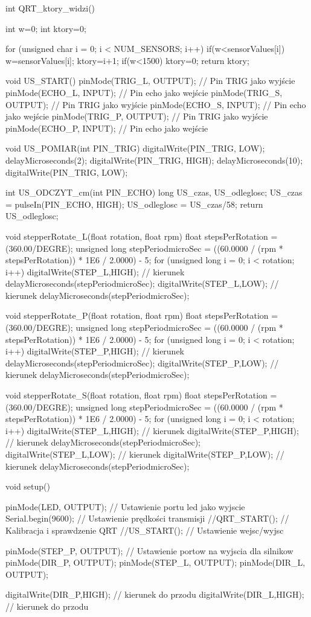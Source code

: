 int QRT_ktory_widzi(){
  int w=0;
  int ktory=0;
  
  for (unsigned char i = 0; i < NUM_SENSORS; i++)
  {
    if(w<sensorValues[i])
    {
      w=sensorValues[i];
      ktory=i+1;
    }
    if(w<1500)
    {
      ktory=0;
    }
  }
  return ktory;
}

void US_START(){
  pinMode(TRIG_L, OUTPUT); // Pin TRIG jako wyjście
  pinMode(ECHO_L, INPUT);  // Pin echo jako wejście
  pinMode(TRIG_S, OUTPUT); // Pin TRIG jako wyjście
  pinMode(ECHO_S, INPUT);  // Pin echo jako wejście
  pinMode(TRIG_P, OUTPUT); // Pin TRIG jako wyjście
  pinMode(ECHO_P, INPUT);  // Pin echo jako wejście
}

void US_POMIAR(int PIN_TRIG){
  digitalWrite(PIN_TRIG, LOW);
  delayMicroseconds(2);
  digitalWrite(PIN_TRIG, HIGH);
  delayMicroseconds(10);
  digitalWrite(PIN_TRIG, LOW);
}

int US_ODCZYT_cm(int PIN_ECHO){
  long US_czas, US_odleglosc;
  US_czas = pulseIn(PIN_ECHO, HIGH);
  US_odleglosc = US_czas/58;
  return US_odleglosc;
}

void stepperRotate_L(float rotation, float rpm) {
  float stepsPerRotation = (360.00/DEGRE);
  unsigned long stepPeriodmicroSec = ((60.0000 / (rpm * stepsPerRotation)) * 1E6 / 2.0000) - 5;
  for (unsigned long i = 0; i < rotation; i++) {
    digitalWrite(STEP_L,HIGH); // kierunek
    delayMicroseconds(stepPeriodmicroSec);
    digitalWrite(STEP_L,LOW); // kierunek
    delayMicroseconds(stepPeriodmicroSec);
  }
}

void stepperRotate_P(float rotation, float rpm) {
  float stepsPerRotation = (360.00/DEGRE);
  unsigned long stepPeriodmicroSec = ((60.0000 / (rpm * stepsPerRotation)) * 1E6 / 2.0000) - 5;
  for (unsigned long i = 0; i < rotation; i++) {
    digitalWrite(STEP_P,HIGH); // kierunek
    delayMicroseconds(stepPeriodmicroSec);
    digitalWrite(STEP_P,LOW); // kierunek
    delayMicroseconds(stepPeriodmicroSec);
  }
}

void stepperRotate_S(float rotation, float rpm) {
  float stepsPerRotation = (360.00/DEGRE);
  unsigned long stepPeriodmicroSec = ((60.0000 / (rpm * stepsPerRotation)) * 1E6 / 2.0000) - 5;
  for (unsigned long i = 0; i < rotation; i++) {
    digitalWrite(STEP_L,HIGH); // kierunek
    digitalWrite(STEP_P,HIGH); // kierunek
    delayMicroseconds(stepPeriodmicroSec);
    digitalWrite(STEP_L,LOW); // kierunek
    digitalWrite(STEP_P,LOW); // kierunek
    delayMicroseconds(stepPeriodmicroSec);
  }
}

void setup() {
  pinMode(LED, OUTPUT); // Ustawienie portu led jako wyjscie
  Serial.begin(9600);   // Ustawienie prędkości transmisji
  //QRT_START();          // Kalibracja i sprawdzenie QRT
  //US_START();           // Ustawienie wejsc/wyjsc

  pinMode(STEP_P, OUTPUT); // Ustawienie portow na wyjscia dla silnikow
  pinMode(DIR_P, OUTPUT);
  pinMode(STEP_L, OUTPUT);
  pinMode(DIR_L, OUTPUT);
  
  digitalWrite(DIR_P,HIGH); // kierunek do przodu
  digitalWrite(DIR_L,HIGH); // kierunek do przodu
}

